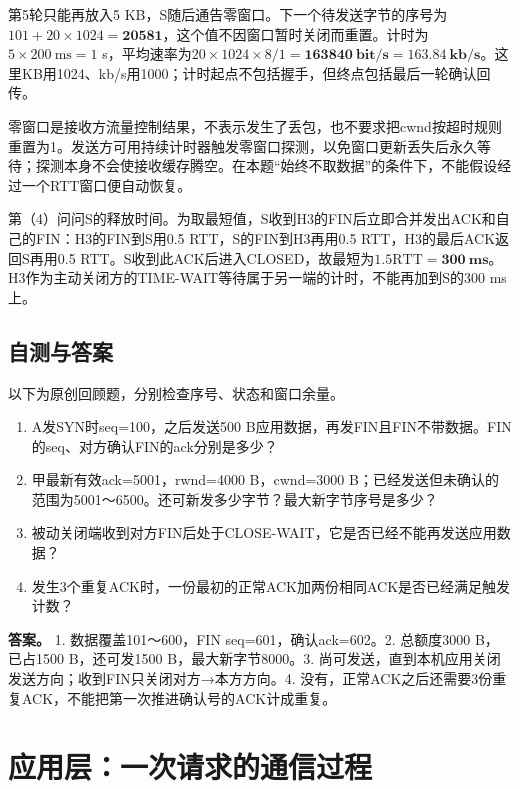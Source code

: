 第5轮只能再放入5 KB，S随后通告零窗口。下一个待发送字节的序号为\(101+20\times1024=\mathbf{20581}\)，这个值不因窗口暂时关闭而重置。计时为\(5\times200\mathrm{\ ms}=1\) s，平均速率为\(20\times1024\times8/1=\mathbf{163840\ bit/s}=\mathbf{163.84\ kb/s}\)。这里KB用1024、kb/s用1000；计时起点不包括握手，但终点包括最后一轮确认回传。

零窗口是接收方流量控制结果，不表示发生了丢包，也不要求把cwnd按超时规则重置为1。发送方可用持续计时器触发零窗口探测，以免窗口更新丢失后永久等待；探测本身不会使接收缓存腾空。在本题``始终不取数据''的条件下，不能假设经过一个RTT窗口便自动恢复。

第（4）问问S的释放时间。为取最短值，S收到H3的FIN后立即合并发出ACK和自己的FIN：H3的FIN到S用0.5 RTT，S的FIN到H3再用0.5 RTT，H3的最后ACK返回S再用0.5 RTT。S收到此ACK后进入CLOSED，故最短为\(1.5\mathrm{RTT}=\mathbf{300\ ms}\)。H3作为主动关闭方的TIME-WAIT等待属于另一端的计时，不能再加到S的300 ms上。

\section{自测与答案}\label{cn-ch5-review}

以下为原创回顾题，分别检查序号、状态和窗口余量。

\begin{enumerate}
\def\labelenumi{\arabic{enumi}.}
\tightlist
\item
  A发SYN时seq=100，之后发送500 B应用数据，再发FIN且FIN不带数据。FIN的seq、对方确认FIN的ack分别是多少？
\item
  甲最新有效ack=5001，rwnd=4000 B，cwnd=3000 B；已经发送但未确认的范围为5001～6500。还可新发多少字节？最大新字节序号是多少？
\item
  被动关闭端收到对方FIN后处于CLOSE-WAIT，它是否已经不能再发送应用数据？
\item
  发生3个重复ACK时，一份最初的正常ACK加两份相同ACK是否已经满足触发计数？
\end{enumerate}

\textbf{答案。} 1. 数据覆盖101～600，FIN seq=601，确认ack=602。2. 总额度3000 B，已占1500 B，还可发1500 B，最大新字节8000。3. 尚可发送，直到本机应用关闭发送方向；收到FIN只关闭对方→本方方向。4. 没有，正常ACK之后还需要3份重复ACK，不能把第一次推进确认号的ACK计成重复。

\chapter{应用层：一次请求的通信过程}\label{cn-ch6}

